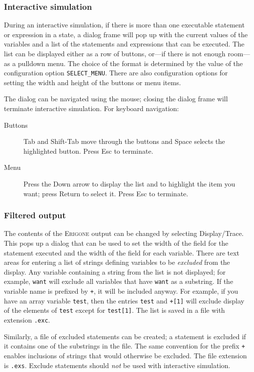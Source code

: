 \documentclass[11pt]{article}
\newcommand{\eri}{\textsc{Erigone}}
\newcommand{\p}[1]{\texttt{#1}}
\newcommand{\bu}[1]{\textsf{#1}}
\begin{document}
\subsubsection{Interactive simulation}

During an interactive simulation, if there is more than one executable
statement or expression in a state, a dialog frame will pop up with the
current values of the variables and a list of the statements and
expressions that can be executed. The list can be displayed either as a
row of buttons, or---if there is not enough room---as a pulldown menu.
The choice of the format is determined by the value of the configuration
option \p{SELECT\_MENU}. There are also configuration options for
setting the width and height of the buttons or menu items.

The dialog can be navigated using the mouse; closing the dialog frame
will terminate interactive simulation. For keyboard navigation:
\begin{description}
\item[Buttons] \bu{Tab} and \bu{Shift-Tab} move through the buttons
and \bu{Space} selects the highlighted button. Press \bu{Esc} to terminate.
\item[Menu] Press the \bu{Down arrow} to display the list and to highlight the
item you want; press \bu{Return} to select it. Press \bu{Esc} to terminate.
\end{description}

\subsubsection{Filtered output}\label{s.filter}
The contents of the \eri{} output can be changed by selecting 
\bu{Display/Trace}. This pops up a dialog that can be used to set the
width of the field for the statement executed and the width of the field
for each variable. There are text areas for entering a list of strings defining 
variables to be \emph{excluded} from the display. Any variable containing 
a string from the list is not displayed; for example, \p{want} will 
exclude all variables that have \p{want} as a substring. If the variable name is 
prefixed by \p{+}, it will be included anyway. For example, if you have an 
array variable \p{test}, then the entries \p{test} and \p{+[1]} will 
exclude display of the elements of \p{test} except for \p{test[1]}. The 
list is saved in a file with extension \p{.exc}.

Similarly, a file of excluded statements can be created; a statement is
excluded if it contains one of the substrings in the file. The same
convention for the prefix \p{+} enables inclusions of strings that would
otherwise be excluded. The file extension is \p{.exs}. \bu{Exclude
statements} should \emph{not} be used with interactive simulation.
\end{document}

